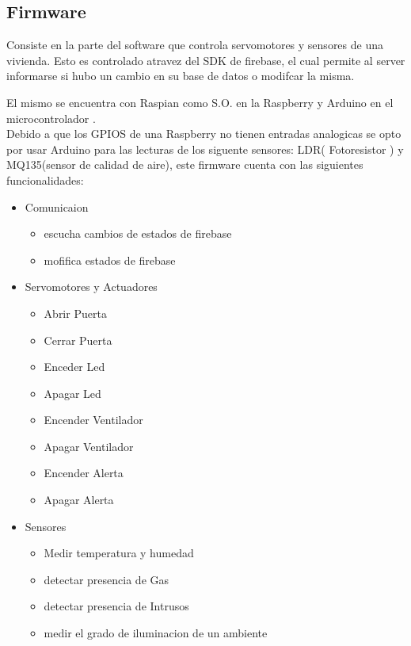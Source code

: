\documentclass[letterpaper,12pt]{article}
\begin{document}
{\begin{figure}[h]
\end{figure}


\subsection{Firmware}

Consiste en la parte del software que controla servomotores y sensores de una vivienda. Esto es controlado atravez del SDK de firebase,  el cual permite al server informarse si hubo un cambio en su base de datos o modifcar la misma. 

El mismo se encuentra con Raspian como S.O.  en la Raspberry  y Arduino en el microcontrolador .\\

Debido a que los GPIOS de una Raspberry no tienen entradas analogicas se opto por usar Arduino para las lecturas de los siguente sensores: LDR( Fotoresistor ) y MQ135(sensor  de calidad de aire), este firmware  cuenta con las siguientes funcionalidades:

\begin{itemize}
	\item Comunicaion
	\begin{itemize}
		\item escucha cambios de estados de firebase
		\item mofifica estados de firebase
	\end{itemize}
	
	\item Servomotores y Actuadores 
	\begin{itemize}
		\item Abrir Puerta
		\item Cerrar Puerta
		\item Enceder Led
		\item Apagar Led
		\item Encender Ventilador
		\item Apagar Ventilador
		\item Encender Alerta
		\item Apagar Alerta
	\end{itemize}
	\item Sensores
	\begin{itemize}
		\item Medir temperatura y humedad
		\item detectar presencia de Gas
		\item detectar presencia de Intrusos
		\item medir el grado de iluminacion de un ambiente
		

\end{itemize}
\end{itemize}}
\end{document}
